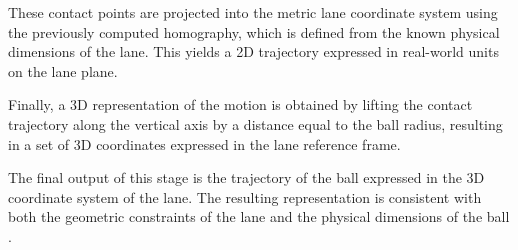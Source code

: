 These contact points are projected into the metric lane coordinate system using the previously computed homography, which is defined from the known physical dimensions of the lane. This yields a 2D trajectory expressed in real-world units on the lane plane.

Finally, a 3D representation of the motion is obtained by lifting the contact trajectory along the vertical axis by a distance equal to the ball radius, resulting in a set of 3D coordinates expressed in the lane reference frame.

The final output of this stage is the trajectory of the ball expressed in the 3D coordinate system of the lane. The resulting representation is consistent with both the geometric constraints of the lane and the physical dimensions of the ball \cite{ball_dimensions}.

